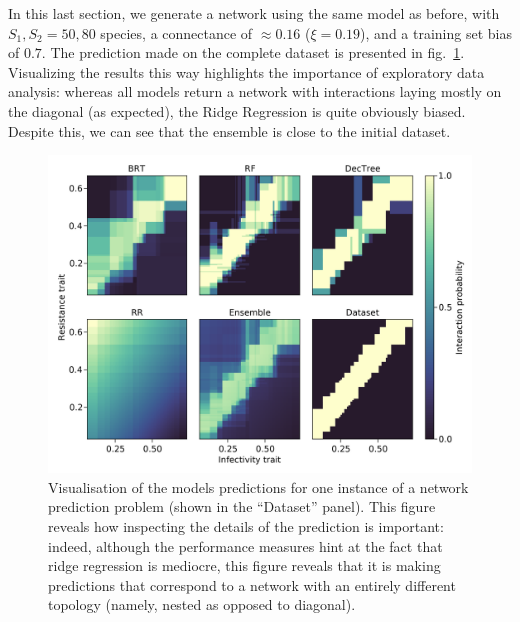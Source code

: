\documentclass[11pt]{article}
\makeatletter
\def\maxwidth{\ifdim\Gin@nat@width>\linewidth\linewidth
\else\Gin@nat@width\fi}
\let\Oldincludegraphics\includegraphics
\renewcommand{\includegraphics}[1]{\Oldincludegraphics[width=\maxwidth]{#1}}
\makeatother
\begin{document}
In this last section, we generate a network using the same model as
before, with \(S_1, S_2 = 50, 80\) species, a connectance of
\(\approx 0.16\) (\(\xi = 0.19\)), and a training set bias of \(0.7\).
The prediction made on the complete dataset is presented in
fig.~\ref{fig:ecovalid}. Visualizing the results this way highlights the
importance of exploratory data analysis: whereas all models return a
network with interactions laying mostly on the diagonal (as expected),
the Ridge Regression is quite obviously biased. Despite this, we can see
that the ensemble is close to the initial dataset.

\begin{figure}
\hypertarget{fig:ecovalid}{%
\centering
\includegraphics{figures/valid_ensemble.png}
\caption{Visualisation of the models predictions for one instance of a
network prediction problem (shown in the ``Dataset'' panel). This figure
reveals how inspecting the details of the prediction is important:
indeed, although the performance measures hint at the fact that ridge
regression is mediocre, this figure reveals that it is making
predictions that correspond to a network with an entirely different
topology (namely, nested as opposed to diagonal).}\label{fig:ecovalid}
}
\end{figure}
\end{document}
